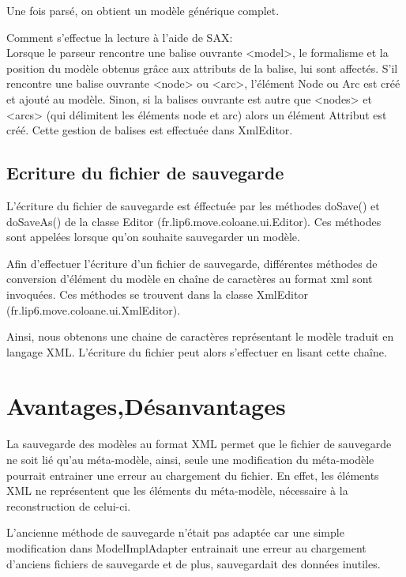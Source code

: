 \documentclass{article}
\begin{document}
Une fois pars\'e, on obtient un mod\`ele g\'en\'erique complet.

Comment s'effectue la lecture \`a l'aide de SAX:\\

Lorsque le parseur rencontre une balise ouvrante <model>, le formalisme et la position du mod\`ele obtenus gr\^ace aux attributs de la balise, lui sont affect\'es.
S'il rencontre une balise ouvrante <node> ou <arc>, l'\'el\'ement Node ou Arc est cr\'e\'e et ajout\'e au mod\`ele.
Sinon, si la balises ouvrante est autre que <nodes> et <arcs> (qui d\'elimitent les \'el\'ements node et arc) alors un \'el\'ement Attribut est cr\'e\'e.
Cette gestion de balises est effectu\'ee dans XmlEditor.



\subsection{Ecriture du fichier de sauvegarde}
L'\'ecriture du fichier de sauvegarde est \'effectu\'ee par les m\'ethodes doSave() et doSaveAs() de la classe Editor (fr.lip6.move.coloane.ui.Editor).
Ces m\'ethodes sont appel\'ees lorsque qu'on souhaite sauvegarder un mod\`ele.

Afin d'effectuer l'\'ecriture d'un fichier de sauvegarde, diff\'erentes m\'ethodes de conversion d'\'el\'ement du mod\`ele en cha\^ine de caract\`eres au format xml sont invoqu\'ees.
Ces m\'ethodes se trouvent dans la classe XmlEditor (fr.lip6.move.coloane.ui.XmlEditor).

Ainsi, nous obtenons une chaine de caract\`eres repr\'esentant le mod\`ele traduit en langage XML.
L'\'ecriture du fichier peut alors s'effectuer en lisant cette cha\^ine.

\section{Avantages,D\'esanvantages}

La sauvegarde des mod\`eles au format XML permet que le fichier de sauvegarde ne soit li\'e qu'au m\'eta-mod\`ele, ainsi, seule une modification du m\'eta-mod\`ele pourrait entrainer une erreur au chargement du fichier.
En effet, les \'el\'ements XML ne repr\'esentent que les \'el\'ements du m\'eta-mod\`ele, n\'ecessaire \`a la reconstruction de celui-ci.

L'ancienne m\'ethode de sauvegarde n'\'etait pas adapt\'ee car une simple modification dans ModelImplAdapter entrainait une erreur au chargement d'anciens fichiers de sauvegarde et de plus, sauvegardait des donn\'ees inutiles.
\end{document}
